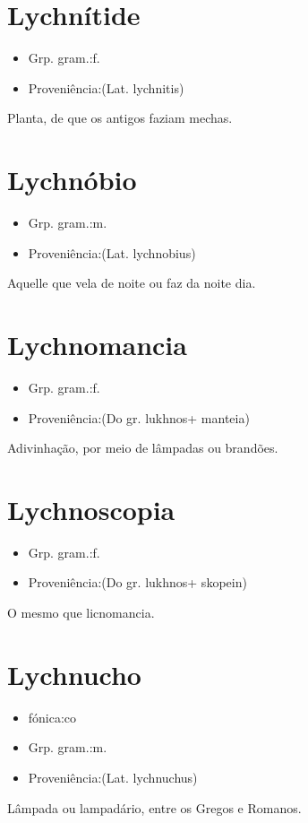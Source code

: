 \section{Lychnítide}
\begin{itemize}
\item {Grp. gram.:f.}
\end{itemize}
\begin{itemize}
\item {Proveniência:(Lat. \textunderscore lychnitis\textunderscore )}
\end{itemize}
Planta, de que os antigos faziam mechas.
\section{Lychnóbio}
\begin{itemize}
\item {Grp. gram.:m.}
\end{itemize}
\begin{itemize}
\item {Proveniência:(Lat. \textunderscore lychnobius\textunderscore )}
\end{itemize}
Aquelle que vela de noite ou faz da noite dia.
\section{Lychnomancia}
\begin{itemize}
\item {Grp. gram.:f.}
\end{itemize}
\begin{itemize}
\item {Proveniência:(Do gr. \textunderscore lukhnos\textunderscore  + \textunderscore manteia\textunderscore )}
\end{itemize}
Adivinhação, por meio de lâmpadas ou brandões.
\section{Lychnoscopia}
\begin{itemize}
\item {Grp. gram.:f.}
\end{itemize}
\begin{itemize}
\item {Proveniência:(Do gr. \textunderscore lukhnos\textunderscore  + \textunderscore skopein\textunderscore )}
\end{itemize}
O mesmo que \textunderscore licnomancia\textunderscore .
\section{Lychnucho}
\begin{itemize}
\item {fónica:co}
\end{itemize}
\begin{itemize}
\item {Grp. gram.:m.}
\end{itemize}
\begin{itemize}
\item {Proveniência:(Lat. \textunderscore lychnuchus\textunderscore )}
\end{itemize}
Lâmpada ou lampadário, entre os Gregos e Romanos.
